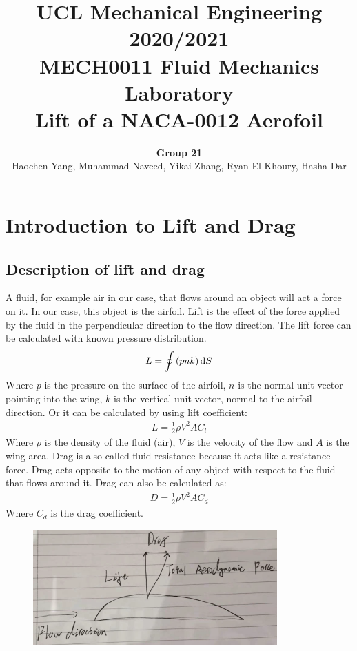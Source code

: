 \documentclass[11pt]{article}
\begin{document}
\title{\textbf{UCL Mechanical Engineering 2020/2021}\\MECH0011 Fluid Mechanics Laboratory\\
Lift of a NACA-0012 Aerofoil}
\author{\textbf{Group 21}\\Haochen Yang, Muhammad Naveed, Yikai Zhang, Ryan El Khoury, Hasha Dar}
\maketitle
\section*{Introduction to Lift and Drag}
\subsection*{Description of lift and drag}
A fluid, for example air in our case, that flows around an object will act a force on it. In our case, this object is the airfoil. Lift is the effect of the force applied by the fluid in the perpendicular direction to the flow direction. The lift force can be calculated with known pressure distribution.
\begin{align}
  L = \oint \left(p n k \right)\dif S
\end{align}
Where $p$ is the pressure on the surface of the airfoil, $n$ is the normal unit vector pointing into the wing, $k$ is the vertical unit vector, normal to the airfoil direction. Or it can be calculated by using lift coefficient:
\begin{align}
  L = \frac{1}{2} \rho V^2 A C_l
\end{align}
Where $\rho$ is the density of the fluid (air), $V$ is the velocity of the flow and $A$ is the wing area. Drag is also called fluid resistance because it acts like a resistance force. Drag acts opposite to the motion of any object with respect to the fluid that flows around it. Drag can also be calculated as:
\begin{align}
  D = \frac{1}{2} \rho V^2 A C_d 
\end{align}
Where $C_d$ is the drag coefficient.
\begin{figure}[H]
  \centering
  \includegraphics[width = 0.5 \textwidth]{./img/diagram1.png}
  \caption{}
\end{figure}
\end{document}
